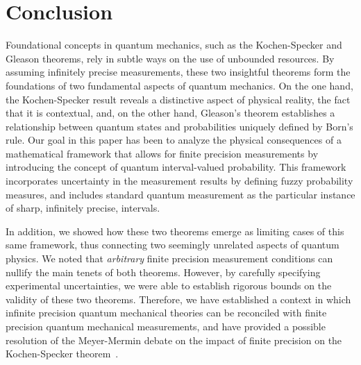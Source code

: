 \documentclass[english,reprint, aps, prl,superscriptaddress, showpacs,
showkeys, longbibliography, amsmath, amssymb, floatfix]{revtex4-1}
\theoremstyle{plain}
\theoremstyle{definition}
\newcommand{\andy}[1]{\fbox{\begin{minipage}{0.9\linewidth}\color{blue}{Andy says: #1}\end{minipage}}}
\begin{document}
\section{Conclusion}
\label{sec:Conclusion}
  
Foundational concepts in quantum mechanics, such as the Kochen-Specker
and Gleason theorems, rely in subtle ways on the use of
unbounded resources. By assuming infinitely precise measurements,
these two insightful theorems form the foundations of two fundamental aspects of
quantum mechanics. On the one hand, the Kochen-Specker result reveals a
distinctive aspect of physical reality, the fact that it is
contextual, and, on the other hand, Gleason's theorem establishes a
relationship between quantum states and probabilities uniquely defined
by Born's rule.  Our goal in this paper has been to analyze the
physical consequences of a mathematical framework that allows for
finite precision measurements by introducing the concept of quantum
interval-valued probability. This framework incorporates uncertainty
in the measurement results by defining fuzzy probability measures, and
includes standard quantum measurement as the particular instance of
sharp, infinitely precise, intervals.  

In addition, we showed how these two theorems emerge as limiting cases
of this same framework, thus connecting two seemingly unrelated
aspects of quantum physics. We noted that {\it arbitrary\/} finite
precision measurement conditions can nullify the main tenets of both
theorems. However, by carefully specifying experimental uncertainties,
we were able to establish rigorous bounds on the validity of these two
theorems. Therefore, we have established a context in which infinite
precision quantum mechanical theories can be reconciled with finite
precision quantum mechanical measurements, and have provided a
possible resolution of the Meyer-Mermin debate on the impact of finite
precision on the Kochen-Specker
theorem~\cite{PhysRevLett.83.3751,Mermin1999}.



\end{document}
